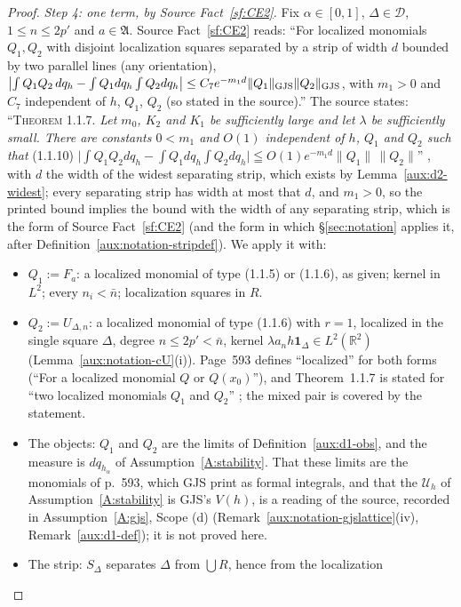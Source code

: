 \documentclass[11pt,a4paper]{article}
\theoremstyle{plain}
\theoremstyle{definition}
\theoremstyle{plain}
\theoremstyle{definition}
\newcommand{\R}{\mathbb{R}}
\newcommand{\Uc}{\mathcal U}
\begin{document}
\begin{proof}
\emph{Step 4: one term, by Source Fact~\ref{sf:CE2}.}  Fix $\alpha\in[0,1]$, $\Delta\in\mathcal D$,
$1\le n\le2p'$ and $a\in\mathfrak A$.  Source Fact~\ref{sf:CE2} reads:
``For localized monomials $Q_1,Q_2$ with disjoint localization squares separated by a strip of
width $d$ bounded by two parallel lines (any orientation),
$\bigl|\int Q_1Q_2\,dq_h-\int Q_1dq_h\int Q_2dq_h\bigr|\le
C_7e^{-m_1d}\|Q_1\|_{\rm GJS}\|Q_2\|_{\rm GJS}$, with $m_1>0$ and $C_7$ independent of $h$,
$Q_1$, $Q_2$ (so stated in the source).''  The source states: ``\textsc{Theorem} 1.1.7.
\emph{Let $m_0$, $K_2$ and $K_1$ be sufficiently large and let $\lambda$ be sufficiently small.
There are constants $0<m_1$ and $O(1)$ independent of $h$, $Q_1$ and $Q_2$ such that}
(1.1.10) $\bigl|\int Q_1Q_2dq_h-\int Q_1dq_h\int Q_2dq_h\bigr|\leqq O(1)e^{-m_1d}\|Q_1\|\,
\|Q_2\|$'' \cite[p.~594]{GJS}, with $d$ the width of the widest separating strip, which exists by
Lemma~\ref{aux:d2-widest}; every separating strip has width at most that $d$, and $m_1>0$, so the
printed bound implies the bound with the width of any separating strip, which is the form of Source Fact~\ref{sf:CE2}
(and the form in which \S\ref{sec:notation} applies it, after
Definition~\ref{aux:notation-stripdef}).  We apply it with:
\begin{itemize}
\item $Q_1:=F_a$: a localized monomial of type (1.1.5) or (1.1.6), as given; kernel in $L^2$;
  every $n_i<\bar n$; localization squares in $R$.
\item $Q_2:=U_{\Delta,n}$: a localized monomial of type (1.1.6) with $r=1$, localized in the
  single square $\Delta$, degree $n\le2p'<\bar n$, kernel $\lambda a_nh\mathbf 1_\Delta\in
  L^2(\R^2)$ (Lemma~\ref{aux:notation-cU}(i)).  Page~593 defines ``localized'' for both forms (``For a
  localized monomial $Q$ or $Q(x_0)$''), and Theorem~1.1.7 is stated for ``two localized
  monomials $Q_1$ and $Q_2$'' \cite[p.~594]{GJS}; the mixed pair is covered by the statement.
\item The objects: $Q_1$ and $Q_2$ are the limits of Definition~\ref{aux:d1-obs}, and the measure
  is $dq_{h_\alpha}$ of Assumption~\ref{A:stability}.  That these limits are the monomials of
  p.~593, which GJS print as formal integrals, and that the $\Uc_h$ of
  Assumption~\ref{A:stability} is GJS's $V(h)$, is a reading of the source, recorded in
  Assumption~\ref{A:gjs}, Scope (d) (Remark~\ref{aux:notation-gjslattice}(iv),
  Remark~\ref{aux:d1-def}); it is not proved here.
\item The strip: $S_\Delta$ separates $\Delta$ from $\bigcup R$, hence from the localization

\end{itemize}
\end{proof}
\end{document}
